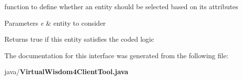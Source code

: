 function to define whether an entity should be selected based on its attributes 


\begin{DoxyParams}{Parameters}
{\em e} & entity to consider \\
\hline
\end{DoxyParams}
\begin{DoxyReturn}{Returns}
true if this entity satisfies the coded logic 
\end{DoxyReturn}


The documentation for this interface was generated from the following file\+:\begin{DoxyCompactItemize}
\item 
java/{\bf Virtual\+Wisdom4\+Client\+Tool.\+java}\end{DoxyCompactItemize}
